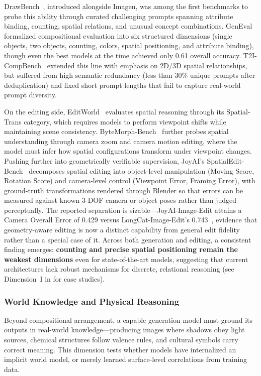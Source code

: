 \documentclass{llmxive}
\begin{document}
DrawBench~\citep{saharia2022imagegen}, introduced alongside Imagen, was among the first benchmarks to probe this ability through curated challenging prompts spanning attribute binding, counting, spatial relations, and unusual concept combinations. GenEval~\citep{GenEval} formalized compositional evaluation into six structured dimensions (single objects, two objects, counting, colors, spatial positioning, and attribute binding), though even the best models at the time achieved only 0.61 overall accuracy. T2I-CompBench~\citep{huang2023t2i} extended this line with emphasis on 2D/3D spatial relationships, but suffered from high semantic redundancy (less than 30\% unique prompts after deduplication) and fixed short prompt lengths that fail to capture real-world prompt diversity.

On the editing side, EditWorld~\citep{EditWorld} evaluates spatial reasoning through its Spatial-Trans category, which requires models to perform viewpoint shifts while maintaining scene consistency. ByteMorph-Bench~\citep{ByteMorph} further probes spatial understanding through camera zoom and camera motion editing, where the model must infer how spatial configurations transform under viewpoint changes. Pushing further into geometrically verifiable supervision, JoyAI's SpatialEdit-Bench~\citep{xiao2026spatialedit} decomposes spatial editing into object-level manipulation (Moving Score, Rotation Score) and camera-level control (Viewpoint Error, Framing Error), with ground-truth transformations rendered through Blender so that errors can be measured against known 3-DOF camera or object poses rather than judged perceptually. The reported separation is sizable---JoyAI-Image-Edit attains a Camera Overall Error of 0.429 versus LongCat-Image-Edit's 0.743~\citep{jdjoyaiimage}, evidence that geometry-aware editing is now a distinct capability from general edit fidelity rather than a special case of it. Across both generation and editing, a consistent finding emerges: \textbf{counting and precise spatial positioning remain the weakest dimensions} even for state-of-the-art models, suggesting that current architectures lack robust mechanisms for discrete, relational reasoning (see Dimension~I in  for case studies).


\subsubsection{World Knowledge and Physical Reasoning}

Beyond compositional arrangement, a capable generation model must ground its outputs in real-world knowledge---producing images where shadows obey light sources, chemical structures follow valence rules, and cultural symbols carry correct meaning. This dimension tests whether models have internalized an implicit world model, or merely learned surface-level correlations from training data.
\end{document}
